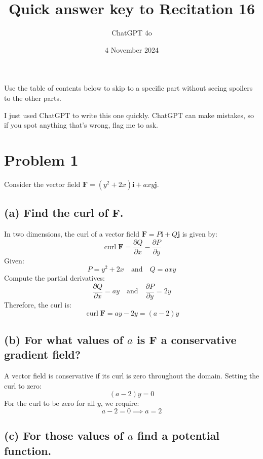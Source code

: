 \documentclass[11pt]{article}
\begin{document}
\title{Quick answer key to Recitation 16}
\author{ChatGPT 4o}
\date{4 November 2024}
\maketitle

Use the table of contents below to skip to a specific part
without seeing spoilers to the other parts.

I just used ChatGPT to write this one quickly.
ChatGPT can make mistakes, so if you spot anything that's wrong, flag me to ask.

\tableofcontents

\newpage

\section{Problem 1}

Consider the vector field $\mathbf{F} = (y^2 + 2x)\mathbf{i} + a x y \mathbf{j}$.

\newpage

\subsection{(a) Find the curl of $\mathbf{F}$.}

In two dimensions, the curl of a vector field $\mathbf{F} = P\mathbf{i} + Q\mathbf{j}$ is given by:
\[
\operatorname{curl} \mathbf{F} = \frac{\partial Q}{\partial x} - \frac{\partial P}{\partial y}
\]
Given:
\[
P = y^2 + 2x \quad \text{and} \quad Q = a x y
\]
Compute the partial derivatives:
\[
\frac{\partial Q}{\partial x} = a y \quad \text{and} \quad \frac{\partial P}{\partial y} = 2 y
\]
Therefore, the curl is:
\[
\operatorname{curl} \mathbf{F} = a y - 2 y = (a - 2) y
\]

\newpage

\subsection{(b) For what values of $a$ is $\mathbf{F}$ a conservative gradient field?}

A vector field is conservative if its curl is zero throughout the domain. Setting the curl to zero:
\[
(a - 2) y = 0
\]
For the curl to be zero for all $y$, we require:
\[
a - 2 = 0 \implies a = 2
\]

\newpage

\subsection{(c) For those values of $a$ find a potential function.}
\end{document}
